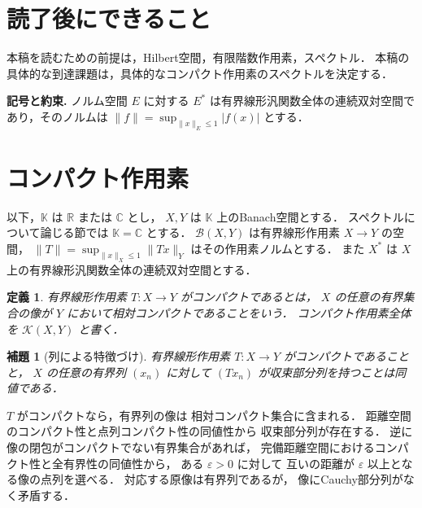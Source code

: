 \documentclass[a5paper,10pt,onecolumn]{jsarticle}
\makeatletter
\theoremstyle{mathnotetheorem}
\newtheorem{definition}[theorem]{定義}
\newtheorem{lemma}[theorem]{補題}
\renewcommand{\proofname}{証明}
\renewenvironment{proof}[1][\proofname]{%
  \par\pushQED{\qed}\normalfont\topsep4\p@\@plus2\p@\relax
  \trivlist\item[\hskip\labelsep\bfseries #1]\ignorespaces
}{\popQED\endtrivlist\@endpefalse}
\makeatother
\begin{document}
\section*{読了後にできること}
本稿を読むための前提は，Hilbert空間，有限階数作用素，スペクトル．
本稿の具体的な到達課題は，具体的なコンパクト作用素のスペクトルを決定する．


\par\noindent\textbf{記号と約束.}\quad
ノルム空間 $E$ に対する $E^*$ は有界線形汎関数全体の連続双対空間であり，そのノルムは $\|f\|=\sup_{\|x\|_E\le1}|f(x)|$ とする．
\par

\section{コンパクト作用素}

以下，$\mathbb K$ は $\mathbb R$ または $\mathbb C$ とし，
$X,Y$ は $\mathbb K$ 上のBanach空間とする．
スペクトルについて論じる節では $\mathbb K=\mathbb C$ とする．
$\mathcal B(X,Y)$ は有界線形作用素 $X\to Y$ の空間，
$\|T\|=\sup_{\|x\|_X\le1}\|Tx\|_Y$ はその作用素ノルムとする．
また $X^*$ は $X$ 上の有界線形汎関数全体の連続双対空間とする．

\begin{definition}
有界線形作用素 $T:X\to Y$ が\emph{コンパクト}であるとは，
$X$ の任意の有界集合の像が $Y$ において相対コンパクトであることをいう．
コンパクト作用素全体を $\mathcal K(X,Y)$ と書く．
\end{definition}

\begin{lemma}[列による特徴づけ]\label{lem:seq}
有界線形作用素 $T:X\to Y$ がコンパクトであることと，
$X$ の任意の有界列 $(x_n)$ に対して
$(Tx_n)$ が収束部分列を持つことは同値である．
\end{lemma}
\begin{proof}
$T$ がコンパクトなら，有界列の像は
相対コンパクト集合に含まれる．
距離空間のコンパクト性と点列コンパクト性の同値性から
収束部分列が存在する．
逆に像の閉包がコンパクトでない有界集合があれば，
完備距離空間におけるコンパクト性と全有界性の同値性から，
ある $\varepsilon>0$ に対して
互いの距離が $\varepsilon$ 以上となる像の点列を選べる．
対応する原像は有界列であるが，
像にCauchy部分列がなく矛盾する．
\end{proof}
\end{document}
